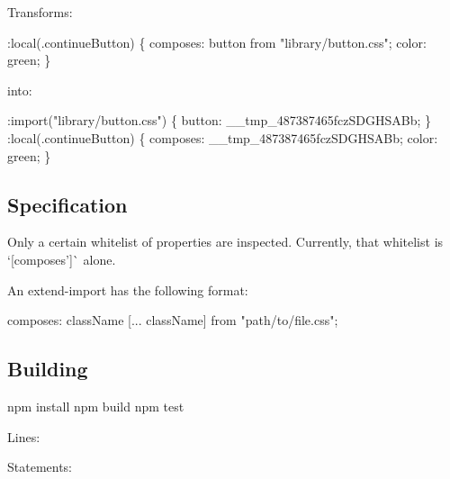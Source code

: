 \href{https://travis-ci.org/css-modules/postcss-modules-extract-imports}{\tt }

Transforms\+:


\begin{DoxyCode}
:local(.continueButton) \{
  composes: button from "library/button.css";
  color: green;
\}
\end{DoxyCode}


into\+:


\begin{DoxyCode}
:import("library/button.css") \{
  button: \_\_tmp\_487387465fczSDGHSABb;
\}
:local(.continueButton) \{
  composes: \_\_tmp\_487387465fczSDGHSABb;
  color: green;
\}
\end{DoxyCode}


\subsection*{Specification}


\begin{DoxyItemize}
\item Only a certain whitelist of properties are inspected. Currently, that whitelist is `\mbox{[}\textquotesingle{}composes'\mbox{]}\`{} alone.
\item An extend-\/import has the following format\+: 
\begin{DoxyCode}
composes: className [... className] from "path/to/file.css";
\end{DoxyCode}

\end{DoxyItemize}

\subsection*{Building}


\begin{DoxyCode}
npm install
npm build
npm test
\end{DoxyCode}


\href{https://travis-ci.org/css-modules/postcss-modules-extract-imports}{\tt }


\begin{DoxyItemize}
\item Lines\+: \href{https://coveralls.io/r/css-modules/postcss-modules-extract-imports?branch=master}{\tt }
\item Statements\+: \href{http://codecov.io/github/css-modules/postcss-modules-extract-imports?branch=master}{\tt }
\end{DoxyItemize}

